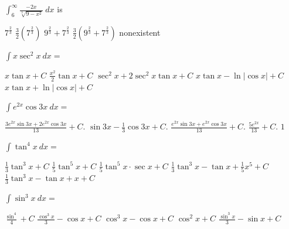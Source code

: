 \begin{questions}
\question[2] $\int_6^\infty \frac{-2x}{\sqrt[3]{9 - x^2}}\ dx$ is

    \begin{oneparchoices}
    \choice $7^\frac{2}{3}$
    \choice $\frac{3}{2}(7^\frac{2}{3})$
    \choice $9^\frac{2}{3} + 7^\frac{2}{3}$
    \choice $\frac{3}{2}(9^\frac{2}{3} + 7^\frac{2}{3})$
    \CorrectChoice nonexistent
    \end{oneparchoices}


\question[2] $\int x\sec^2 x\ dx = $

    \begin{oneparchoices}
    \choice $x\tan x + C$
    \choice $\frac{x^2}{2}\tan x + C$
    \choice $\sec^2 x + 2\sec^2 x \tan x + C$
    \choice $x\tan x - \ln |\cos x| + C$
    \CorrectChoice $x\tan x + \ln |\cos x| + C$
    \end{oneparchoices}

\question[2] $\int e^{2x}\cos 3x\ dx = $

    \begin{oneparchoices}
    \CorrectChoice $\frac{3e^{2x} \sin 3x + 2e^{2x} \cos 3x}{13} + C$.
    \choice $\sin 3x - \frac{1}{3} \cos 3x + C$.
    \choice $\frac{e^{2x} \sin 3x + e^{2x} \cos 3x}{13} + C$.
    \choice $\frac{5e^{2x}}{13} + C$.
    \choice $1$
    \end{oneparchoices}

\question[2] $\int \tan^4 x\ dx = $

    \begin{oneparchoices}
    \choice $\frac{1}{3} \tan^3 x + C$
    \choice $\frac{1}{5} \tan^5 x + C$
    \choice $\frac{1}{5} \tan^5 x \cdot \sec x + C$
    \choice $\frac{1}{3} \tan^3 x - \tan x + \frac{1}{5}x^5 + C$
    \CorrectChoice $\frac{1}{3} \tan^3 x - \tan x + x + C$
    \end{oneparchoices}

\question[2] $\int \sin^3 x\ dx = $

    \begin{oneparchoices}
    \choice $\frac{\sin^4}{4} + C$
    \CorrectChoice $\frac{\cos^3 x}{3} - \cos x + C$
    \choice $\cos^3 x - \cos x + C$
    \choice $\cos^2 x + C$
    \choice $\frac{\sin^3 x}{3} - \sin x + C$
    \end{oneparchoices}


\end{questions}
